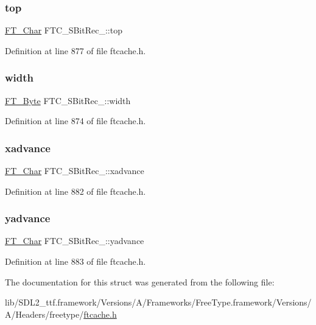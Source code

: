 \subsubsection{\texorpdfstring{top}{top}}
{\footnotesize\ttfamily \mbox{\hyperlink{fttypes_8h_a0f851552b050883885f0a0855771f39d}{F\+T\+\_\+\+Char}} F\+T\+C\+\_\+\+S\+Bit\+Rec\+\_\+\+::top}



Definition at line 877 of file ftcache.\+h.

\mbox{\label{struct_f_t_c___s_bit_rec___a5b92fb4f213a880f758bb87ac2ceb263}} 
\subsubsection{\texorpdfstring{width}{width}}
{\footnotesize\ttfamily \mbox{\hyperlink{fttypes_8h_a51f26183ca0c9f4af958939648caeccd}{F\+T\+\_\+\+Byte}} F\+T\+C\+\_\+\+S\+Bit\+Rec\+\_\+\+::width}



Definition at line 874 of file ftcache.\+h.

\mbox{\label{struct_f_t_c___s_bit_rec___a502a0bb69d973d2ae626a842eb9fefd3}} 
\subsubsection{\texorpdfstring{xadvance}{xadvance}}
{\footnotesize\ttfamily \mbox{\hyperlink{fttypes_8h_a0f851552b050883885f0a0855771f39d}{F\+T\+\_\+\+Char}} F\+T\+C\+\_\+\+S\+Bit\+Rec\+\_\+\+::xadvance}



Definition at line 882 of file ftcache.\+h.

\mbox{\label{struct_f_t_c___s_bit_rec___aabe767ddaf7ff62918886c6f62e9ac28}} 
\subsubsection{\texorpdfstring{yadvance}{yadvance}}
{\footnotesize\ttfamily \mbox{\hyperlink{fttypes_8h_a0f851552b050883885f0a0855771f39d}{F\+T\+\_\+\+Char}} F\+T\+C\+\_\+\+S\+Bit\+Rec\+\_\+\+::yadvance}



Definition at line 883 of file ftcache.\+h.



The documentation for this struct was generated from the following file\+:\begin{DoxyCompactItemize}
\item 
lib/\+S\+D\+L2\+\_\+ttf.\+framework/\+Versions/\+A/\+Frameworks/\+Free\+Type.\+framework/\+Versions/\+A/\+Headers/freetype/\mbox{\hyperlink{ftcache_8h}{ftcache.\+h}}\end{DoxyCompactItemize}
